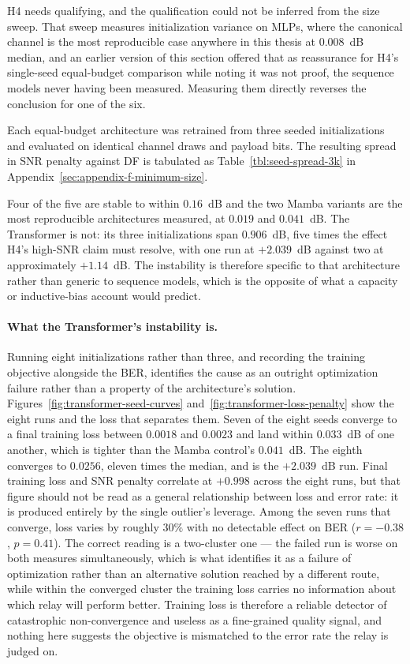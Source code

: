 H4 needs qualifying, and the qualification could not be inferred from the size sweep. That sweep measures initialization variance on MLPs, where the canonical channel is the most reproducible case anywhere in this thesis at $0.008$~dB median, and an earlier version of this section offered that as reassurance for H4's single-seed equal-budget comparison while noting it was not proof, the sequence models never having been measured. Measuring them directly reverses the conclusion for one of the six.

Each equal-budget architecture was retrained from three seeded initializations and evaluated on identical channel draws and payload bits. The resulting spread in SNR penalty against DF is tabulated as Table~\ref{tbl:seed-spread-3k} in Appendix~\ref{sec:appendix-f-minimum-size}.

Four of the five are stable to within $0.16$~dB and the two Mamba variants are the most reproducible architectures measured, at $0.019$ and $0.041$~dB. The Transformer is not: its three initializations span $0.906$~dB, five times the effect H4's high-SNR claim must resolve, with one run at $+2.039$~dB against two at approximately $+1.14$~dB. The instability is therefore specific to that architecture rather than generic to sequence models, which is the opposite of what a capacity or inductive-bias account would predict.

\paragraph{What the Transformer's instability is.} Running eight initializations rather than three, and recording the training objective alongside the BER, identifies the cause as an outright optimization failure rather than a property of the architecture's solution. Figures~\ref{fig:transformer-seed-curves} and~\ref{fig:transformer-loss-penalty} show the eight runs and the loss that separates them. Seven of the eight seeds converge to a final training loss between $0.0018$ and $0.0023$ and land within $0.033$~dB of one another, which is tighter than the Mamba control's $0.041$~dB. The eighth converges to $0.0256$, eleven times the median, and is the $+2.039$~dB run. Final training loss and SNR penalty correlate at $+0.998$ across the eight runs, but that figure should not be read as a general relationship between loss and error rate: it is produced entirely by the single outlier's leverage. Among the seven runs that converge, loss varies by roughly $30\%$ with no detectable effect on BER ($r=-0.38$, $p=0.41$). The correct reading is a two-cluster one --- the failed run is worse on both measures simultaneously, which is what identifies it as a failure of optimization rather than an alternative solution reached by a different route, while within the converged cluster the training loss carries no information about which relay will perform better. Training loss is therefore a reliable detector of catastrophic non-convergence and useless as a fine-grained quality signal, and nothing here suggests the objective is mismatched to the error rate the relay is judged on.

